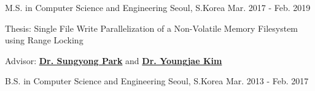 

\begin{cventries}

  \cventry
    {M.S. in Computer Science and Engineering} %
    {\myuniv{}} %
    {Seoul, S.Korea} %
    {Mar. 2017 - Feb. 2019} %
    {
      \begin{cvitems} %
	\item {Thesis: Single File Write Parallelization of a Non-Volatile Memory Filesystem using Range Locking}
	\item {Advisor: \href{http://dcclab.sogang.ac.kr/member/professor}{\textbf{Dr. Sungyong Park}} and \href{https://sites.google.com/site/youkim/home}{\textbf{Dr. Youngjae Kim}}}
      \end{cvitems}
    }


\end{cventries}




\begin{cventries}
  \cventry
    {B.S. in Computer Science and Engineering} %
    {\myuniv{}	} %
    {Seoul, S.Korea} %
    {Mar. 2013 - Feb. 2017} %
	{}


\end{cventries}